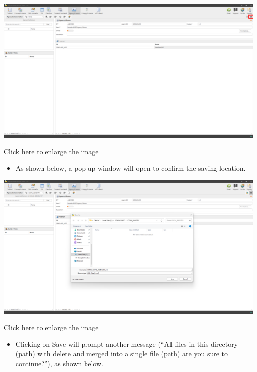 \documentclass[
]{book}
\providecommand{\tightlist}{%
  \setlength{\itemsep}{0pt}\setlength{\parskip}{0pt}}
\begin{document}
\begin{center}\includegraphics[width=1\linewidth]{./images/image072} \end{center}

\href{images/image072.png}{Click here to enlarge the image}

\begin{itemize}
\tightlist
\item
  As shown below, a pop-up window will open to confirm the saving location.
\end{itemize}

\begin{center}\includegraphics[width=1\linewidth]{./images/image074} \end{center}

\href{images/image074.png}{Click here to enlarge the image}

\begin{itemize}
\tightlist
\item
  Clicking on Save will prompt another message (``All files in this directory (path) with delete and merged into a single file (path) are you sure to continue?''), as shown below.
\end{itemize}
\end{document}
